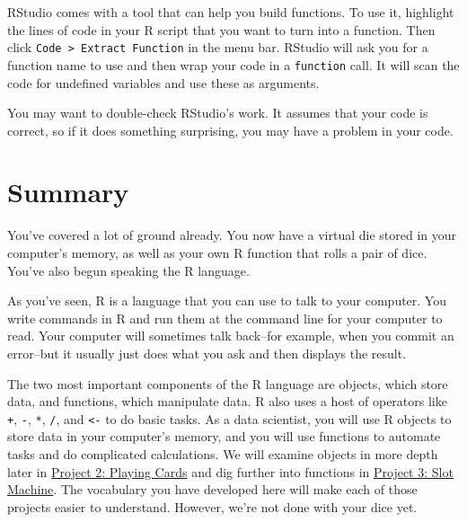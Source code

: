 \documentclass[
  letterpaper,
  DIV=11,
  numbers=noendperiod]{scrbook}
\begin{document}
\begin{tcolorbox}[enhanced jigsaw, breakable, colback=white, colbacktitle=quarto-callout-tip-color!10!white, arc=.35mm, bottomrule=.15mm, coltitle=black, left=2mm, rightrule=.15mm, colframe=quarto-callout-tip-color-frame, leftrule=.75mm, opacitybacktitle=0.6, bottomtitle=1mm, toptitle=1mm, titlerule=0mm, opacityback=0, title=\textcolor{quarto-callout-tip-color}{\faLightbulb}\hspace{0.5em}{Extract function}, toprule=.15mm]

RStudio comes with a tool that can help you build functions. To use it,
highlight the lines of code in your R script that you want to turn into
a function. Then click \texttt{Code\ \textgreater{}\ Extract\ Function}
in the menu bar. RStudio will ask you for a function name to use and
then wrap your code in a \texttt{function} call. It will scan the code
for undefined variables and use these as arguments.

You may want to double-check RStudio's work. It assumes that your code
is correct, so if it does something surprising, you may have a problem
in your code.

\end{tcolorbox}

\section{Summary}\label{summary}

You've covered a lot of ground already. You now have a virtual die
stored in your computer's memory, as well as your own R function that
rolls a pair of dice. You've also begun speaking the R language.

As you've seen, R is a language that you can use to talk to your
computer. You write commands in R and run them at the command line for
your computer to read. Your computer will sometimes talk back--for
example, when you commit an error--but it usually just does what you ask
and then displays the result.

The two most important components of the R language are objects, which
store data, and functions, which manipulate data. R also uses a host of
operators like \texttt{+}, \texttt{-}, \texttt{*}, \texttt{/}, and
\texttt{\textless{}-} to do basic tasks. As a data scientist, you will
use R objects to store data in your computer's memory, and you will use
functions to automate tasks and do complicated calculations. We will
examine objects in more depth later in
\hyperref[sec-project-cards]{Project 2: Playing Cards} and dig further
into functions in \hyperref[sec-project-slots]{Project 3: Slot Machine}.
The vocabulary you have developed here will make each of those projects
easier to understand. However, we're not done with your dice yet.
\end{document}
